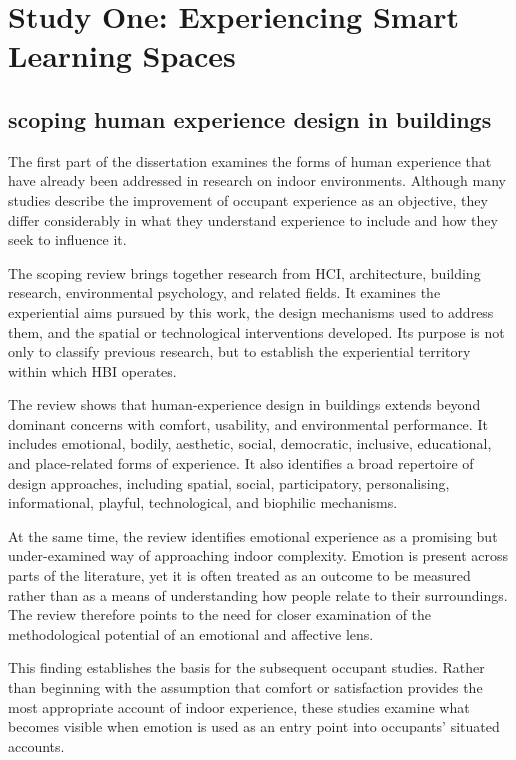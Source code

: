 \chapter{Study One: Experiencing Smart Learning Spaces}\label{ch:study-one}

\begin{synopsis}
\section{scoping human experience design in buildings}

The first part of the dissertation examines the forms of human experience that have already been addressed in research on indoor environments. Although many studies describe the improvement of occupant experience as an objective, they differ considerably in what they understand experience to include and how they seek to influence it.

The scoping review brings together research from HCI, architecture, building research, environmental psychology, and related fields. It examines the experiential aims pursued by this work, the design mechanisms used to address them, and the spatial or technological interventions developed. Its purpose is not only to classify previous research, but to establish the experiential territory within which HBI operates.

The review shows that human-experience design in buildings extends beyond dominant concerns with comfort, usability, and environmental performance. It includes emotional, bodily, aesthetic, social, democratic, inclusive, educational, and place-related forms of experience. It also identifies a broad repertoire of design approaches, including spatial, social, participatory, personalising, informational, playful, technological, and biophilic mechanisms.

At the same time, the review identifies emotional experience as a promising but under-examined way of approaching indoor complexity. Emotion is present across parts of the literature, yet it is often treated as an outcome to be measured rather than as a means of understanding how people relate to their surroundings. The review therefore points to the need for closer examination of the methodological potential of an emotional and affective lens.

This finding establishes the basis for the subsequent occupant studies. Rather than beginning with the assumption that comfort or satisfaction provides the most appropriate account of indoor experience, these studies examine what becomes visible when emotion is used as an entry point into occupants' situated accounts.
\end{synopsis}

